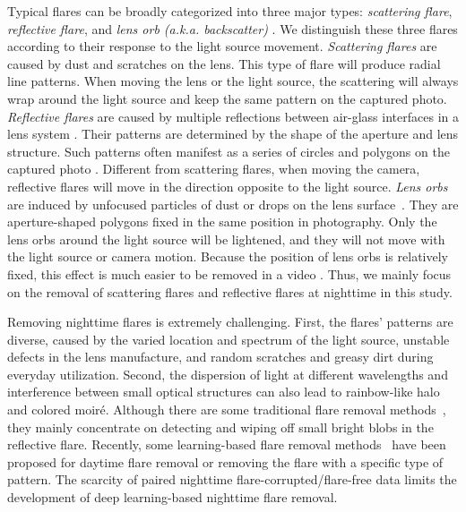\documentclass{article}
\newcommand{\yuekun}[1]{{\color{black}{#1}}}
\begin{document}
Typical flares can be broadly categorized into three major types: \textit{scattering flare}, \textit{reflective flare}, and \textit{lens orb (a.k.a. backscatter)} \yuekun{\cite{how_to,li2021let,flare_simulation1}}. 
We distinguish these three flares according to their response to the light source movement. 
\textit{Scattering flares} are caused by dust and scratches on the lens. This type of flare will produce radial line patterns. 
When moving the lens or the light source, the scattering will always wrap around the light source and keep the same pattern on the captured photo. 
\textit{Reflective flares} are caused by multiple reflections between air-glass interfaces in a lens system \cite{flare_simulation1}. 
Their patterns are determined by the shape of the aperture and lens structure. Such patterns often manifest as a series of circles and polygons on the captured photo \yuekun{\cite{flare_simulation2}}. 
Different from scattering flares, when moving the camera, reflective flares will move in the direction opposite to the light source. 
\textit{Lens orbs} are induced by unfocused particles of dust or drops on the lens surface~\yuekun{\cite{gu2009removing}}. 
They are aperture-shaped polygons fixed in the same position in photography. 
Only the lens orbs around the light source will be lightened, and they will not move with the light source or camera motion. 
Because the position of lens orbs is relatively fixed, this effect is much easier to be removed in a video \yuekun{\cite{li2021let}}. 
Thus, we mainly focus on the removal of scattering flares and reflective flares at nighttime in this study.

Removing nighttime flares is extremely challenging.
First, the flares' patterns are diverse, caused by the varied location and spectrum of the light source, unstable defects in the lens manufacture, and random scratches and greasy dirt during everyday utilization. 
Second, the dispersion of light at different wavelengths and interference between small optical structures can also lead to rainbow-like halo and colored moiré. 
Although there are some traditional flare removal methods~\cite{automated_removal,auto_removal,auto_removal2}, they mainly concentrate on detecting and wiping off small bright blobs in the reflective flare.
Recently, some learning-based flare removal methods~\cite{how_to,light_source,rank_1,feng2021removing} have been proposed for daytime flare removal or removing the flare with 
a specific type of pattern. The scarcity of paired nighttime flare-corrupted/flare-free data limits the development of deep learning-based nighttime flare removal.
\end{document}
